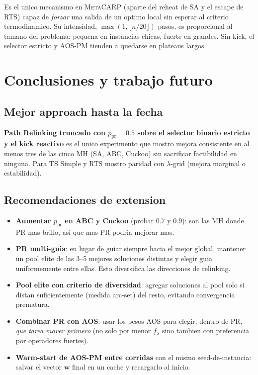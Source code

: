 \documentclass[11pt,a4paper]{article}
\newcommand{\mh}{MH}
\begin{document}
Es el unico mecanismo en \textsc{MetaCARP} (aparte del reheat de SA y
el escape de RTS) capaz de \emph{forzar} una salida de un optimo local
sin esperar al criterio termodinamico. Su intensidad,
$\max(1, \lfloor n/20\rfloor)$ pasos, es proporcional al tamano del
problema: pequena en instancias chicas, fuerte en grandes. Sin kick,
el selector estricto y AOS-PM tienden a quedarse en plateaus largos.

\section{Conclusiones y trabajo futuro}\label{sec:conclusiones}

\subsection{Mejor approach hasta la fecha}

\textbf{Path Relinking truncado con $p_{\text{pr}}=0.5$ sobre el selector
binario estricto y el kick reactivo} es el unico experimento que
mostro mejora consistente en al menos tres de las cinco \mh{} (SA, ABC,
Cuckoo) sin sacrificar factibilidad en ninguna. Para TS Simple y RTS
mostro paridad con $\lambda$-grid (mejora marginal o estabilidad).

\subsection{Recomendaciones de extension}

\begin{itemize}
\item \textbf{Aumentar $p_{\text{pr}}$ en ABC y Cuckoo} (probar 0.7 y
0.9): son las \mh{} donde PR mas brillo, asi que mas PR podria mejorar
mas.
\item \textbf{PR multi-guia}: en lugar de guiar siempre hacia el mejor
global, mantener un pool elite de las 3--5 mejores soluciones distintas
y elegir guia uniformemente entre ellas. Esto diversifica las
direcciones de relinking.
\item \textbf{Pool elite con criterio de diversidad}: agregar
soluciones al pool solo si distan suficientemente (medida arc-set) del
resto, evitando convergencia prematura.
\item \textbf{Combinar PR con AOS}: usar los pesos AOS para elegir,
dentro de PR, \emph{que tarea mover primero} (no solo por menor
$f_\lambda$ sino tambien con preferencia por operadores fuertes).
\item \textbf{Warm-start de AOS-PM entre corridas} con el mismo
seed-de-instancia: salvar el vector $\mathbf{w}$ final en un cache y
recargarlo al inicio.
\end{itemize}
\end{document}

